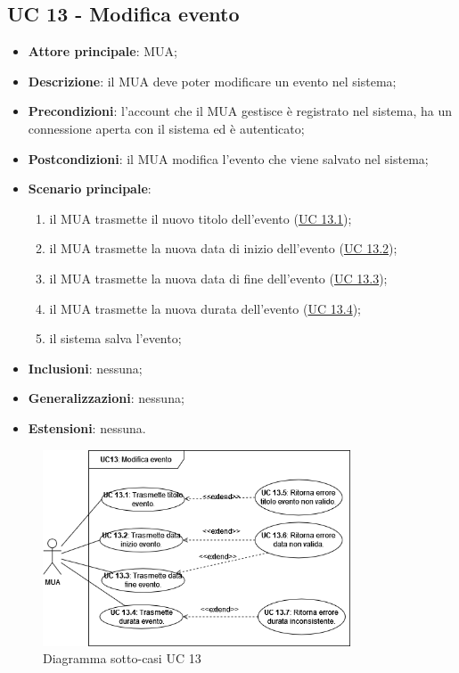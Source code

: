 \subsection{UC 13 - Modifica evento} \label{sec:UC13}
    \begin{itemize}
        \item \textbf{Attore principale}: MUA;
        \item \textbf{Descrizione}: il MUA deve poter modificare un evento nel sistema;
        \item \textbf{Precondizioni}: l’account che il MUA gestisce è registrato nel sistema, ha un connessione aperta con il sistema ed è autenticato;
        \item \textbf{Postcondizioni}: il MUA modifica l'evento che viene salvato nel sistema;
        \item \textbf{Scenario principale}:
            \begin{enumerate}
                \item il MUA trasmette il nuovo titolo dell'evento (\hyperref[sec:UC13.1]{UC 13.1});
                \item il MUA trasmette la nuova data di inizio dell'evento (\hyperref[sec:UC13.2]{UC 13.2});
                \item il MUA trasmette la nuova data di fine dell'evento (\hyperref[sec:UC13.3]{UC 13.3});
                \item il MUA trasmette la nuova durata dell'evento (\hyperref[sec:UC13.4]{UC 13.4});
                \item il sistema salva l'evento;
            \end{enumerate}
        \item \textbf{Inclusioni}: nessuna;
        \item \textbf{Generalizzazioni}: nessuna;
        \item \textbf{Estensioni}: nessuna.
    \end{itemize}

\begin{figure}[H]
    \includegraphics[width=0.813\textwidth]{sections/uc_imgs/UC13.png}
    \centering
    \caption{Diagramma sotto-casi UC 13}
\end{figure}

